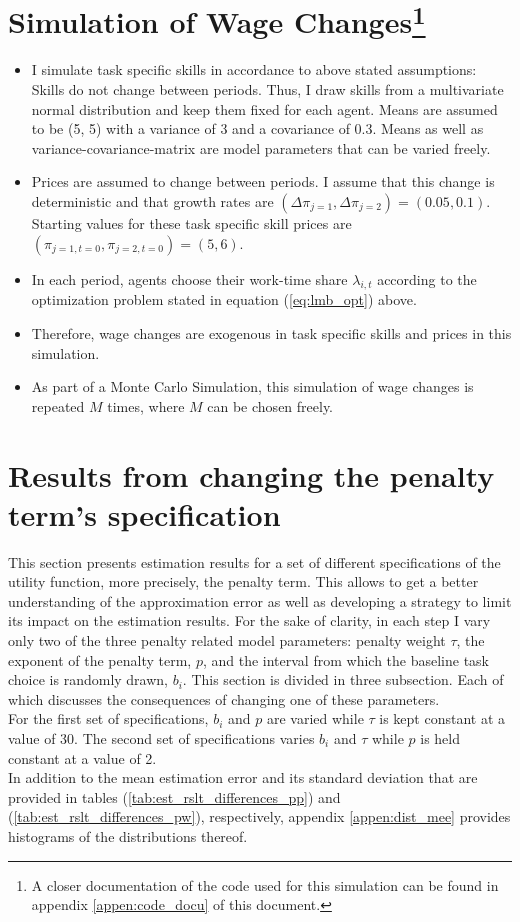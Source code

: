 \documentclass{article}
\begin{document}
\section[Simulation of Wage Changes]{Simulation of Wage Changes\footnote{A closer documentation of the code used for this simulation can be found in appendix \ref{appen:code_docu} of this document.} }
	\begin{itemize}
		\item{I simulate task specific skills in accordance to above stated assumptions: Skills do not change between periods. Thus, I draw skills from a multivariate normal distribution and keep them fixed for each agent. Means are assumed to be (5, 5) with a variance of 3 and a covariance of 0.3. Means as well as variance-covariance-matrix are model parameters that can be varied freely.}
		\item{Prices are assumed to change between periods. I assume that this change is deterministic and that growth rates are $(\Delta \pi_{j=1}, \Delta \pi_{j=2})=(0.05, 0.1)$. Starting values for these task specific skill prices are $(\pi_{j=1, t=0}, \pi_{j=2, t=0})=(5, 6)$.}
		\item{In each period, agents choose their work-time share $\lambda_{i,t}$ according to the optimization problem stated in equation (\ref{eq:lmb_opt}) above.}
		\item{Therefore, wage changes are exogenous in task specific skills and prices in this simulation.}
		\item{As part of a Monte Carlo Simulation, this simulation of wage changes is repeated $M$ times, where $M$ can be chosen freely.}
	\end{itemize}


\section{Results from changing the penalty term's specification}
	This section presents estimation results for a set of different specifications of the utility function, more precisely, the penalty term. This allows to get a better understanding of the approximation error as well as developing a strategy to limit its impact on the estimation results. For the sake of clarity, in each step I vary only two of the three penalty related model parameters: penalty weight $\tau$, the exponent of the penalty term, $p$, and the interval from which the baseline task choice is randomly drawn, $b_i$. This section is divided in three subsection. Each of which discusses the consequences of changing one of these parameters. \\
	For the first set of specifications, $b_i$ and $p$ are varied while $\tau$ is kept constant at a value of 30. The second set of specifications varies $b_i$ and $\tau$ while $p$ is held constant at a value of 2. \\ %
	In addition to the mean estimation error and its standard deviation that are provided in tables (\ref{tab:est_rslt_differences_pp}) and (\ref{tab:est_rslt_differences_pw}), respectively, appendix \ref{appen:dist_mee} provides histograms of the distributions thereof.
\end{document}
